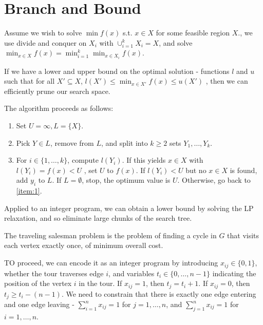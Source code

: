 \section{Branch and Bound}
\label{sec:branch-bound}

\begin{defn}
  \label{sec:branch-bound-1}
  Assume we wish to solve $\min f(x)$ s.t. $x \in X$ for some feasible
  region $X$., we use divide and conquer on $X_{i}$ with
  $\cup_{i=1}^{k} X_{i} = X$, and solve $\min_{x \in X} f(x) =
  \min_{i=1}^{k} \min_{x \in X_{i}} f(x)$.

  If we have a lower and upper bound on the optimal solution -
  functions $l$ and $u$ such that for all $X' \subseteq X$, $l(X')
  \leq \min_{x \in X'} f(x) \leq u(X')$ , then we can efficiently
  prune our search space.

  The algorithm proceeds as follows:
  \begin{enumerate}
  \item Set $U = \infty, L = \{ X \} $.
  \item\label{item:1} Pick $Y \in L$, remove from $L$, and split into $k \geq 2$
    sets $Y_{1}, \dots, Y_{k}$.
  \item For $i \in \{ 1, \dots, k \} $, compute $l(Y_{i})$.  If this
    yields $x \in X$ with $l(Y_{i}) = f(x) < U$ , set $U$ to $f(x)$.
    If $l(Y_{i}) < U$ but no $x \in X$ is found, add $y_{i}$ to $L$.
    If $L = \emptyset$, stop, the optimum value is $U$.  Otherwise, go
    back to \ref{item:1}.
  \end{enumerate}
\end{defn}

\begin{thm}
  \label{sec:branch-bound-2}
  Applied to an integer program, we can obtain a lower bound by
  solving the LP relaxation, and so eliminate large chunks of the
  search tree.
\end{thm}

\begin{defn}
  \label{sec:branch-bound-3}
  The traveling salesman problem is the problem of finding a cycle in
  $G$ that visits each vertex exactly once, of minimum overall cost.

  TO proceed, we can encode it as an integer program by introducing
  $x_{ij} \in \{ 0, 1 \} $, whether the tour traverses edge $i$, and
  variables $t_{i} \in \{ 0, \dots, n-1 \} $ indicating the position
  of the vertex $i$ in the tour. If $x_{ij} = 1$, then $t_{j} = t_{i}
  + 1$. If $x_{ij} = 0$, then $t_{j} \geq t_{i} - (n-1)$. We need to
  constrain that there is exactly one edge entering and one edge
  leaving - $\sum_{i=1}^{n} x_{ij} = 1$ for $j = 1, \dots, n$, and
  $\sum_{j=1}^{n} x_{ij} = 1$ for $i = 1, \dots, n$.
\end{defn}

